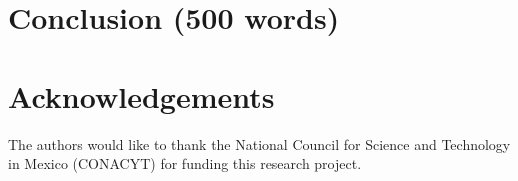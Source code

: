 \documentclass[pdftex,11pt,a4paper]{article}
\theoremstyle{definition}
\theoremstyle{remark}
\begin{document}
\label{section_results}

\section{Conclusion (500 words)}
\label{section_conclusion}
\blindtext

\section*{Acknowledgements}


The authors would like to thank the National Council for Science and Technology in Mexico (CONACYT) for funding this research project.




\end{document}
